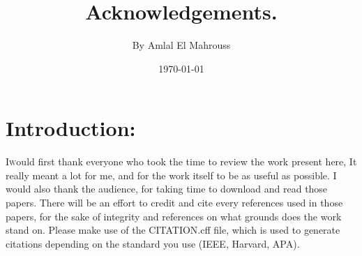 \documentclass[10pt]{article}
\title{%
	\vspace{-1.5em}%
	\large\textbf{Acknowledgements.}%
}
\author{By Amlal El Mahrouss}
\date{\today}
\theoremstyle{plain}
\theoremstyle{definition}
\theoremstyle{remark}
\begin{document}

\maketitle

\section{Introduction:}

\lettrine[lines=1, lhang=0.1, loversize=0.2]{I} would first thank everyone who took the time to review the work present here, It really meant a lot for me, and for the work itself to be as useful as possible. I would also thank the audience, for taking time to download and read those papers.
There will be an effort to credit and cite every references used in those papers, for the sake of integrity and references on what grounds does the work stand on.
Please make use of the CITATION.cff file, which is used to generate citations depending on the standard you use (IEEE, Harvard, APA).

\end{document}
